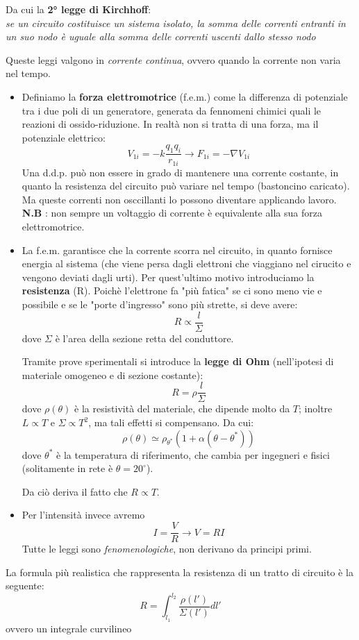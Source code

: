 \documentclass{article}
\begin{document}
Da cui la \textbf{2° legge di Kirchhoff}:  \\
\centering
\textit{se un circuito costituisce un sistema isolato, la somma
delle correnti entranti in un suo nodo è uguale alla somma delle correnti uscenti dallo stesso nodo}
\justifying


Queste leggi valgono in \textit{corrente continua}, ovvero quando la corrente non varia nel tempo. 

\begin{itemize}
    \item Definiamo la \textbf{forza elettromotrice} (f.e.m.) come la differenza di potenziale tra i due poli di un generatore, generata da fennomeni chimici quali le reazioni di ossido-riduzione.
In realtà non si tratta di una forza, ma il potenziale elettrico:
\[
V_{1i}= - k \frac{q_1 q_i}{r_{1i}} \rightarrow F_{1i} = - \nabla V_{1i} 
\]
Una d.d.p. può non essere in grado di mantenere una corrente costante, in quanto la resistenza del circuito può variare nel tempo (bastoncino caricato). Ma queste correnti non osccillanti lo possono diventare applicando lavoro.\\
\textbf{N.B} : non sempre un voltaggio di corrente è equivalente alla sua forza elettromotrice.  

\item La f.e.m. garantisce che la corrente scorra nel circuito, in quanto fornisce energia al sistema (che viene persa dagli elettroni che viaggiano nel cirucito e vengono deviati dagli urti). Per quest'ultimo motivo introduciamo la 
\textbf{resistenza} (R). Poichè l'elettrone fa "più fatica" se ci sono meno vie e possibile e se le "porte d'ingresso" sono più strette, si deve avere:
\[
R \propto \frac{l}{\Sigma}
\]
dove $\Sigma$ è l'area della sezione retta del conduttore.

Tramite prove sperimentali si introduce la \textbf{legge di Ohm} (nell'ipotesi di materiale omogeneo e di sezione costante):
\[
R= \rho \frac{l}{\Sigma}
\]
dove $\rho (\theta)$ è la resistività del materiale, che dipende molto da $T$; inoltre $L \propto T$ e $\Sigma \propto T^2$, ma tali effetti si compensano. Da cui:
\[
\rho(\theta) \simeq \rho_{\theta^*}(1 + \alpha (\theta - \theta^*))
\]
dove $\theta^*$ è la temperatura di riferimento, che cambia per ingegneri e fisici (solitamente in rete è $\theta=20^{\circ}$).

Da ciò deriva il fatto che $R \propto T$.

\item Per l'intensità invece avremo 
\[
I = \frac{V}{R} \rightarrow V = R I
\]
Tutte le leggi sono \textit{fenomenologiche}, non derivano da principi primi.
\end{itemize}
La formula più realistica che rappresenta la resistenza di un tratto di circuito è la seguente:
\[
R = \int_{l_1}^{l_2} \frac{\rho(l')}{\Sigma(l')} dl'
\]
ovvero un integrale curvilineo\\
\end{document}
